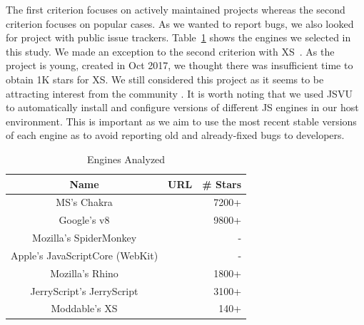 \documentclass[10pt,conference,anonymous]{IEEEtran}
\begin{document}
The first criterion focuses on actively maintained projects whereas
the second criterion focuses on popular cases. As we wanted to report
bugs, we also looked for project with public issue trackers.
Table~\ref{tab:engines} shows the engines we selected in this
study. We made an exception to the second criterion with
XS~. As the project is young, created in Oct 2017, we
thought there was insufficient time to obtain 1K stars for XS. We
still considered this project as it seems to be attracting interest
from the community
. It is worth noting that we used
JSVU~\cite{jsvu} to automatically install and configure versions of
different JS engines in our host environment. This is important as we
aim to use the most recent stable versions of each engine as to avoid
reporting old and already-fixed bugs to developers.


\begin{table}[t]
  \centering
  \caption{\label{tab:engines}Engines Analyzed}
  \begin{tabular}{ccr}
    \toprule
    Name & URL & \# Stars \\
    \midrule
    MS's Chakra & \cite{chakra2018repo} & 7200+ \\
    Google's v8 & \cite{v82018repo} & 9800+ \\
    Mozilla's SpiderMonkey & \cite{spidermonkey2018repo} & - \\
    Apple's JavaScriptCore (WebKit) & \cite{jsc2018repo} & - \\
    Mozilla's Rhino & \cite{rhino2018repo} & 1800+ \\
    JerryScript's JerryScript & \cite{jerryscript2018repo} & 3100+ \\
    Moddable's XS & \cite{xs2018repo} & 140+ \\
   \bottomrule     
  \end{tabular}
\end{table}
\end{document}
